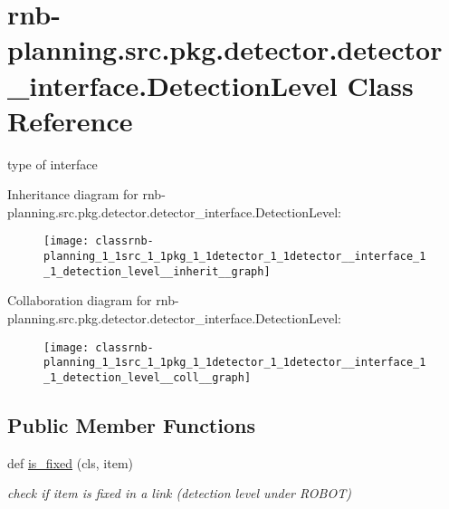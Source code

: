 \hypertarget{classrnb-planning_1_1src_1_1pkg_1_1detector_1_1detector__interface_1_1_detection_level}{}\section{rnb-\/planning.src.\+pkg.\+detector.\+detector\+\_\+interface.\+Detection\+Level Class Reference}
\label{classrnb-planning_1_1src_1_1pkg_1_1detector_1_1detector__interface_1_1_detection_level}


type of interface  




Inheritance diagram for rnb-\/planning.src.\+pkg.\+detector.\+detector\+\_\+interface.\+Detection\+Level\+:
\nopagebreak
\begin{figure}[H]
\begin{center}
\leavevmode
\texttt{[image: classrnb-planning\_1\_1src\_1\_1pkg\_1\_1detector\_1\_1detector\_\_interface\_1\_1\_detection\_level\_\_inherit\_\_graph]}
\end{center}
\end{figure}


Collaboration diagram for rnb-\/planning.src.\+pkg.\+detector.\+detector\+\_\+interface.\+Detection\+Level\+:
\nopagebreak
\begin{figure}[H]
\begin{center}
\leavevmode
\texttt{[image: classrnb-planning\_1\_1src\_1\_1pkg\_1\_1detector\_1\_1detector\_\_interface\_1\_1\_detection\_level\_\_coll\_\_graph]}
\end{center}
\end{figure}
\subsection*{Public Member Functions}
\begin{DoxyCompactItemize}
\item 
\mbox{\label{classrnb-planning_1_1src_1_1pkg_1_1detector_1_1detector__interface_1_1_detection_level_af01832d548cf07b00e9609f33731890a}} 
def \hyperlink{classrnb-planning_1_1src_1_1pkg_1_1detector_1_1detector__interface_1_1_detection_level_af01832d548cf07b00e9609f33731890a}{is\+\_\+fixed} (cls, item)
\begin{DoxyCompactList}\small\item\em check if item is fixed in a link (detection level under R\+O\+B\+OT) \end{DoxyCompactList}\end{DoxyCompactItemize}
